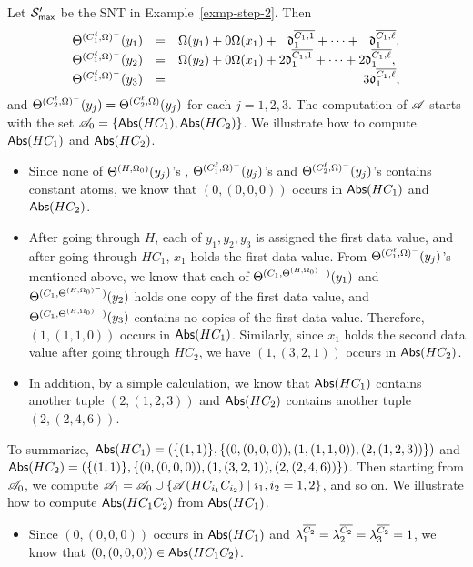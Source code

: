\begin{example}\label{exmp-step-3}
Let ${\mathcal{S} }'_{\sf max}$ be the SNT in Example~\ref{exmp-step-2}. Then
\[
\begin{array}{l c l}
\sumf^{(C^\ell_1, \initval)^{-}}(y_1) &= & \initval(y_1) + 0 \initval(x_1) +\ \ \vard^{\circled{C_1, 1}}_1 + \dots +\ \ \vard^{\circled{C_1, \ell}}_1,\\
%
\sumf^{(C^\ell_1, \initval)^-}(y_2) &=& \initval(y_2) + 0 \initval(x_1) + 2 \vard^{\circled{C_1, 1}}_1 + \dots + 2 \vard^{\circled{C_1, \ell}}_1,\\
%
\sumf^{(C^\ell_1, \initval)^-}(y_3) &=& \hspace{5.1cm} 3 \vard^{\circled{C_1, \ell}}_1,
\end{array}
\] 
and $\Theta^{(C^\ell_2, \Omega)^-}(y_j) = \Theta^{(C^\ell_2, \Omega)}(y_j)$ for each $j=1,2,3$.
The computation of $\mathscr{A}$ starts with the set $\mathscr{A}_0 = \{\mathsf{Abs}(HC_1), \mathsf{Abs}(HC_2)\}$. We illustrate how to compute $\mathsf{Abs}(HC_1)$ and $\mathsf{Abs}(HC_2)$. 
\begin{itemize}
\item Since none of $\Theta^{(H, \Omega_0)}(y_j)$'s , $\Theta^{(C^\ell_1, \Omega)^{-}}(y_j)$'s and $\Theta^{(C^\ell_2, \Omega)^{-}}(y_j)$'s contains constant atoms, we know that $(0, (0,0,0))$ occurs in $\mathsf{Abs}(HC_1)$ and  $\mathsf{Abs}(HC_2)$. 
%
\item After going through $H$, each of $y_1,y_2,y_3$ is assigned the first data value, and after going through $HC_1$, $x_1$ holds the first data value. From $\Theta^{(C^\ell_1, \Omega)^{-}}(y_j)$'s mentioned above, we know that each of $\Theta^{(C_1, \Theta^{(H, \Omega_0)^{-}})}(y_1)$ and $\Theta^{(C_1, \Theta^{(H, \Omega_0)^{-}})}(y_2)$ holds one copy of the first data value,  and $\Theta^{(C_1, \Theta^{(H, \Omega_0)^{-}})}(y_3)$ contains no copies of the first data value. Therefore, $(1, (1,1,0))$ occurs in $\mathsf{Abs}(HC_1)$. Similarly, since $x_1$ holds the second data value after going through $HC_2$, we have $(1, (3, 2, 1))$ occurs in $\mathsf{Abs}(HC_2)$. 
%
\item In addition, by a simple calculation, we know that $\mathsf{Abs}(HC_1)$ contains another tuple $(2,(1, 2, 3))$ and $\mathsf{Abs}(HC_2)$ contains another tuple $(2, (2, 4, 6))$.
\end{itemize}
To summarize, $\mathsf{Abs}(HC_1)=(\{(1,1)\}, \{(0, (0,0,0)), (1, (1, 1, 0)), (2, (1, 2, 3))\})$ and $\mathsf{Abs}(HC_2) = (\{(1,1)\}, \{(0, (0, 0, 0)), (1, (3, 2,1)), (2, (2, 4, 6))\})$. Then starting from $\mathscr{A}_0$, we compute $\mathscr{A}_1 = \mathscr{A}_0 \cup \{\mathscr{A}(HC_{i_1}C_{i_2}) \mid i_1, i_2 = 1, 2\}$, and so on. We illustrate how to compute $\mathsf{Abs}(HC_1 C_2)$ from $\mathsf{Abs}(HC_1)$. 
\begin{itemize}
\item Since $(0, (0,0,0))$ occurs in $\mathsf{Abs}(HC_1)$ and $\lambda^{\overline{C_2}}_1 = \lambda^{\overline{C_2}}_2 = \lambda^{\overline{C_2}}_3 = 1$, we know that $(0, (0,0,0)) \in \mathsf{Abs}(HC_1C_2)$.


\end{itemize}
\end{example}
